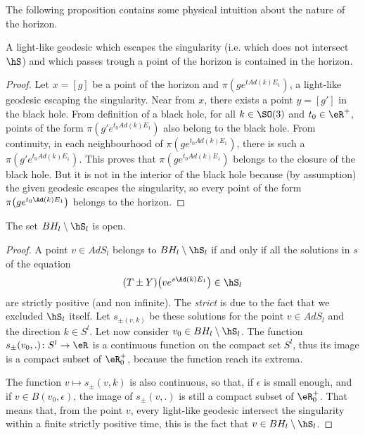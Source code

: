 The following proposition contains some physical intuition about the nature of the horizon.

\begin{proposition}
A light-like geodesic which escapes the singularity (i.e. which does not intersect $\hS$) and which passes trough a point of the horizon is contained in the horizon.
\end{proposition}

\begin{proof}
Let $x=[g]$ be a point of the horizon and $\pi(ge^{tAd(k)E_1})$, a light-like geodesic escaping the singularity. Near from $x$, there exists a point $y=[g']$ in the black hole. From definition of a black hole, for all $k\in \SO(3)$ and $t_{0}\in\eR^{+}$, points of the form  $\pi(g'e^{t_0Ad(k)E_1})$ also belong to the black hole. From continuity, in each neighbourhood of $\pi(ge^{t_0Ad(k)E_1})$, there is such a $\pi(g'e^{t_0Ad(k)E_1})$. This proves that $\pi(ge^{t_0Ad(k)E_1})$ belongs to the closure of the black hole. But it is not in the interior of the black hole because (by assumption) the given geodesic escapes the singularity, so every point of the form $\pi\big( g e^{t_0\Ad(k)E_1} \big)$ belongs to the horizon.
\end{proof}

\begin{proposition}		\label{PropTNFerme}
The set $BH_l\setminus\hS_l$ is open.
\end{proposition}

\begin{proof}
A point $v\in AdS_l$ belongs to $BH_l\setminus\hS_l$ if and only if all  the solutions in $s$ of the equation
\begin{equation}
	(T\pm Y)\big( v e^{s\Ad(k)E_1} \big)\in\hS_l
\end{equation}
are strictly positive (and non infinite). The \emph{strict} is due to the fact that we excluded $\hS_l$ itself. Let $s_{\pm(v,k)}$ be these solutions for the point $v\in AdS_l$ and the direction $k\in S^l$. Let now consider $v_0\in BH_l\setminus\hS_l$. The function $s_{\pm}(v_0,.)\colon S^l\to \eR$ is a continuous function on the compact set $S^l$, thus its image is a compact subset of $\eR_0^+$, because the function reach its extrema.

The function $v\mapsto s_{\pm}(v,k)$ is also continuous, so that, if $\epsilon$ is small enough, and if $v\in B(v_0,\epsilon)$, the image of $s_{\pm}(v,.)$ is still a compact subset of $\eR_0^+$. That means that, from the point $v$, every light-like geodesic intersect the singularity within a finite strictly positive time, this is the fact that $v\in BH_l\setminus\hS_l$.
\end{proof}

